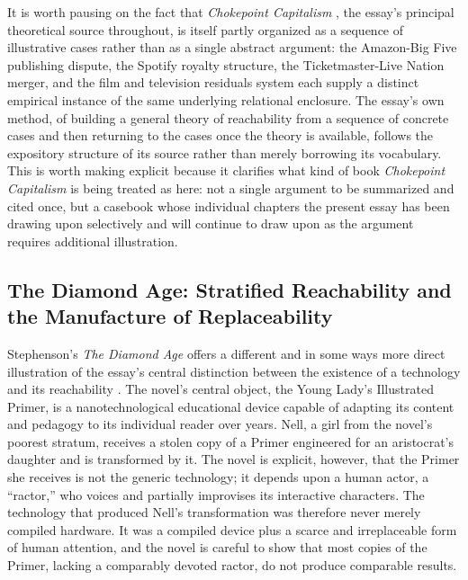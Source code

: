 \documentclass[11pt]{article}
\begin{document}
It is worth pausing on the fact that \emph{Chokepoint Capitalism} \parencite{doctorowgiblin2022chokepoint}, the essay's principal theoretical source throughout, is itself partly organized as a sequence of illustrative cases rather than as a single abstract argument: the Amazon-Big Five publishing dispute, the Spotify royalty structure, the Ticketmaster-Live Nation merger, and the film and television residuals system each supply a distinct empirical instance of the same underlying relational enclosure. The essay's own method, of building a general theory of reachability from a sequence of concrete cases and then returning to the cases once the theory is available, follows the expository structure of its source rather than merely borrowing its vocabulary. This is worth making explicit because it clarifies what kind of book \emph{Chokepoint Capitalism} is being treated as here: not a single argument to be summarized and cited once, but a casebook whose individual chapters the present essay has been drawing upon selectively and will continue to draw upon as the argument requires additional illustration.

\subsection{The Diamond Age: Stratified Reachability and the Manufacture of Replaceability}

Stephenson's \emph{The Diamond Age} offers a different and in some ways more direct illustration of the essay's central distinction between the existence of a technology and its reachability \parencite{stephenson1995diamondage}. The novel's central object, the Young Lady's Illustrated Primer, is a nanotechnological educational device capable of adapting its content and pedagogy to its individual reader over years. Nell, a girl from the novel's poorest stratum, receives a stolen copy of a Primer engineered for an aristocrat's daughter and is transformed by it. The novel is explicit, however, that the Primer she receives is not the generic technology; it depends upon a human actor, a ``ractor,'' who voices and partially improvises its interactive characters. The technology that produced Nell's transformation was therefore never merely compiled hardware. It was a compiled device plus a scarce and irreplaceable form of human attention, and the novel is careful to show that most copies of the Primer, lacking a comparably devoted ractor, do not produce comparable results.
\end{document}
